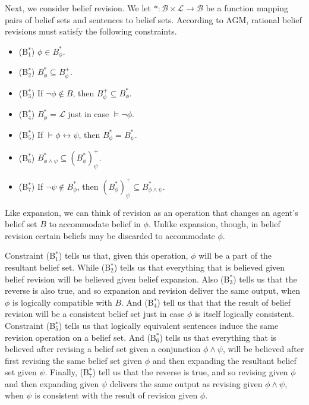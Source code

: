 Next, we consider belief revision.
We let $*: \mathcal{B} \times \mathcal{L} \rightarrow \mathcal{B}$ be a function mapping pairs of belief sets and sentences to belief sets.
According to AGM, rational belief revisions must satisfy the following constraints.
\begin{itemize}
\item[](B$^*_1$) \quad $\phi \in B^*_\phi$.
\item[](B$^*_2$) \quad  $B^*_\phi \subseteq B^+_\phi$.
\item[](B$^*_3$) \quad If $\lnot \phi \not \in B$, then $B^+_\phi \subseteq B^*_\phi$.
\item[](B$^*_4$) \quad $B^*_\phi = \mathcal{L}$ just in case $ \models \lnot \phi$.
\item[](B$^*_5$) \quad If $\models \phi \leftrightarrow \psi$, then $B^*_\phi = B^*_\psi$.
\item[](B$^*_6$) \quad $B^*_{\phi \wedge \psi} \subseteq (B^*_\phi)^+_\psi$.
\item[](B$^*_7$) \quad If $\lnot \psi \not \in B^*_\phi$, then $(B^*_\phi)^+_\psi \subseteq B^*_{\phi \wedge \psi}$.
\end{itemize}

Like expansion, we can think of revision as an operation that changes an agent's belief set $B$ to accommodate belief in $\phi$.
Unlike expansion, though, in belief revision certain beliefs may be discarded to accommodate $\phi$.

Constraint (B$^*_1$) tells us that, given this operation, $\phi$ will be a part of the resultant belief set.
While (B$^*_2$) tells us that everything that is believed given belief revision will be believed given belief expansion.
Also (B$^*_3$) tells us that the reverse is also true, and so expansion and revision deliver the same output, when $\phi$ is logically compatible with $B$.
And (B$^*_4$) tell us that that the result of belief revision will be a consistent belief set just in case $\phi$ is itself logically consistent.
Constraint (B$^*_5$) tells us that logically equivalent sentences induce the same revision operation on a belief set.
And (B$^*_6$) tells us that everything that is believed after revising a belief set given a conjunction $\phi \wedge \psi$, will be believed after first revising the same belief set given $\phi$ and then expanding the resultant belief set given $\psi$.
Finally, (B$^*_7$) tell us that the reverse is true, and so revising given $\phi$ and then expanding given $\psi$ delivers the same output as revising given $\phi \wedge \psi$, when $\psi$ is consistent with the result of revision given $\phi$.


